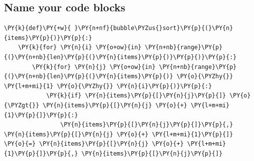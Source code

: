 \documentclass[a4paper,twoside]{article}
\begin{document}
\subsection{Name your code blocks}
\begin{tscode}[lang=py, title={bubble\_sort.py}, engine=pygments]
\begin{Verbatim}[commandchars=\\\{\},breaklines, breakanywhere, commandchars=\\\{\}]
\PY{k}{def}\PY{+w}{ }\PY{n+nf}{bubble\PYZus{}sort}\PY{p}{(}\PY{n}{items}\PY{p}{)}\PY{p}{:}
    \PY{k}{for} \PY{n}{i} \PY{o+ow}{in} \PY{n+nb}{range}\PY{p}{(}\PY{n+nb}{len}\PY{p}{(}\PY{n}{items}\PY{p}{)}\PY{p}{)}\PY{p}{:}
        \PY{k}{for} \PY{n}{j} \PY{o+ow}{in} \PY{n+nb}{range}\PY{p}{(}\PY{n+nb}{len}\PY{p}{(}\PY{n}{items}\PY{p}{)} \PY{o}{\PYZhy{}} \PY{l+m+mi}{1} \PY{o}{\PYZhy{}} \PY{n}{i}\PY{p}{)}\PY{p}{:}
            \PY{k}{if} \PY{n}{items}\PY{p}{[}\PY{n}{j}\PY{p}{]} \PY{o}{\PYZgt{}} \PY{n}{items}\PY{p}{[}\PY{n}{j} \PY{o}{+} \PY{l+m+mi}{1}\PY{p}{]}\PY{p}{:}
                \PY{n}{items}\PY{p}{[}\PY{n}{j}\PY{p}{]}\PY{p}{,} \PY{n}{items}\PY{p}{[}\PY{n}{j} \PY{o}{+} \PY{l+m+mi}{1}\PY{p}{]} \PY{o}{=} \PY{n}{items}\PY{p}{[}\PY{n}{j} \PY{o}{+} \PY{l+m+mi}{1}\PY{p}{]}\PY{p}{,} \PY{n}{items}\PY{p}{[}\PY{n}{j}\PY{p}{]}
\end{Verbatim}
\end{tscode}
\end{document}
